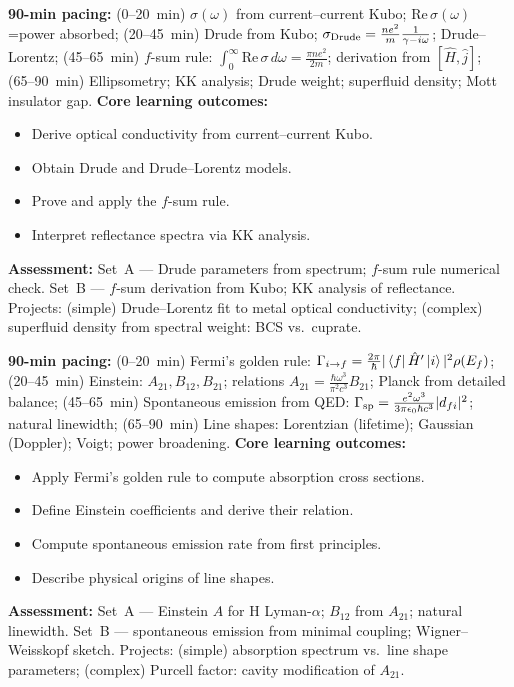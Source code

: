 \documentclass[11pt,a4paper]{article}
\begin{document}
\medskip

\begin{tcolorbox}[modulebox, title={Module~II.6 --- Lecture L05: Optical Conductivity and the $f$-Sum Rule}]
\textbf{90-min pacing:} (0--20~min) $\sigma(\omega)$ from current--current Kubo; Re$\,\sigma(\omega)$=power absorbed; (20--45~min) Drude from Kubo; $\sigma_{\rm Drude}=\tfrac{ne^2}{m}\tfrac{1}{\gamma-i\omega}$; Drude--Lorentz; (45--65~min) $f$-sum rule: $\int_0^\infty\text{Re}\,\sigma\,d\omega=\tfrac{\pi ne^2}{2m}$; derivation from $[\hat{H},\hat{j}]$; (65--90~min) Ellipsometry; KK analysis; Drude weight; superfluid density; Mott insulator gap.
\medskip\textbf{Core learning outcomes:}
\begin{itemize}[leftmargin=1.4em,topsep=2pt,itemsep=1pt]
  \item Derive optical conductivity from current--current Kubo.
  \item Obtain Drude and Drude--Lorentz models.
  \item Prove and apply the $f$-sum rule.
  \item Interpret reflectance spectra via KK analysis.
\end{itemize}
\medskip\textbf{Assessment:}
Set~A --- Drude parameters from spectrum; $f$-sum rule numerical check.
Set~B --- $f$-sum derivation from Kubo; KK analysis of reflectance.
Projects: (simple) Drude--Lorentz fit to metal optical conductivity; (complex) superfluid density from spectral weight: BCS vs.\ cuprate.
\end{tcolorbox}

\medskip

\begin{tcolorbox}[modulebox, title={Module~II.6 --- Lecture L06: Absorption, Emission, and Einstein Coefficients}]
\textbf{90-min pacing:} (0--20~min) Fermi's golden rule: $\Gamma_{i\to f}=\tfrac{2\pi}{\hbar}|\bra{f}\hat{H}'\ket{i}|^2\rho(E_f)$; (20--45~min) Einstein: $A_{21},B_{12},B_{21}$; relations $A_{21}=\tfrac{\hbar\omega^3}{\pi^2c^3}B_{21}$; Planck from detailed balance; (45--65~min) Spontaneous emission from QED: $\Gamma_{\rm sp}=\tfrac{e^2\omega^3}{3\pi\epsilon_0\hbar c^3}|d_{fi}|^2$; natural linewidth; (65--90~min) Line shapes: Lorentzian (lifetime); Gaussian (Doppler); Voigt; power broadening.
\medskip\textbf{Core learning outcomes:}
\begin{itemize}[leftmargin=1.4em,topsep=2pt,itemsep=1pt]
  \item Apply Fermi's golden rule to compute absorption cross sections.
  \item Define Einstein coefficients and derive their relation.
  \item Compute spontaneous emission rate from first principles.
  \item Describe physical origins of line shapes.
\end{itemize}
\medskip\textbf{Assessment:}
Set~A --- Einstein $A$ for H Lyman-$\alpha$; $B_{12}$ from $A_{21}$; natural linewidth.
Set~B --- spontaneous emission from minimal coupling; Wigner--Weisskopf sketch.
Projects: (simple) absorption spectrum vs.\ line shape parameters; (complex) Purcell factor: cavity modification of $A_{21}$.
\end{tcolorbox}
\end{document}
